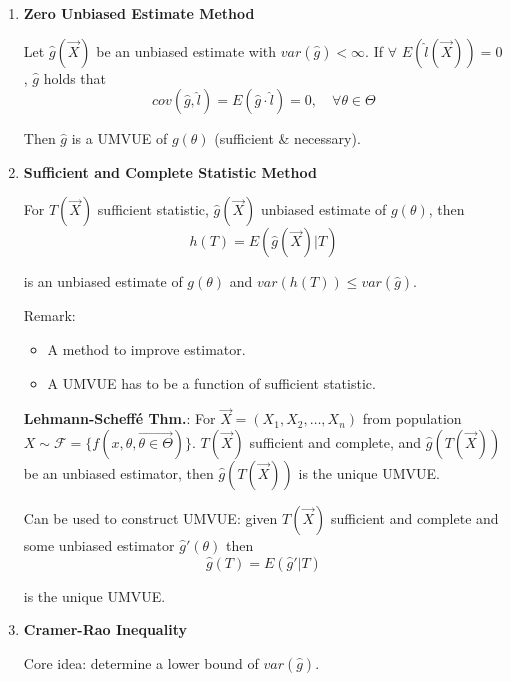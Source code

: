 \begin{enumerate}
\item \textbf{Zero Unbiased Estimate Method}
            
    Let $\hat{g}(\vec{X})$ be an unbiased estimate with $var(\hat{g})<\infty$. If $\forall$ $E(\hat{l}(\vec{X}))=0$ , $\hat{g}$ holds that
    \[
        cov(\hat{g},\hat{l})=E(\hat{g}\cdot\hat{l})=0,\quad\forall\theta\in\Theta    
    \]

    Then $\hat{g}$ is a UMVUE of $g(\theta)$ (sufficient \& necessary).





\item \textbf{Sufficient and Complete Statistic Method}

    For $T(\vec{X})$ sufficient statistic, $\hat{g}(\vec{X})$ unbiased estimate of $g(\theta)$, then 
\[
    h(T)=E(\hat{g}(\vec{X})| T)    
\]

    is an unbiased estimate of $g(\theta)$ and $var(h(T))\leq var(\hat{g})$.

    Remark:
    \begin{itemize}
        \item A method to improve estimator.
        \item A UMVUE has to be a function of sufficient statistic.
    \end{itemize}

    \textbf{Lehmann-Scheffé Thm.}: For $\vec{X}=(X_1,X_2,\ldots,X_n)$ from population $X\sim\mathscr{F}=\{f(x,\theta,\vec{\theta\in\Theta})\}$. $T(\vec{X})$ sufficient and complete, and $\hat{g}(T(\vec{X}))$ be an unbiased estimator, then $\hat{g}(T(\vec{X}))$ is the unique UMVUE.

    Can be used to construct UMVUE: given $T(\vec{X})$ sufficient and complete and some unbiased estimator $\hat{g}\prime(\theta)$ then 
    \[
        \hat{g}(T)=E(\hat{g}\prime|T)    
    \]

    is the unique UMVUE.



\item \textbf{Cramer-Rao Inequality}

    Core idea: determine a lower bound of $var(\hat{g})$.


\end{enumerate}
